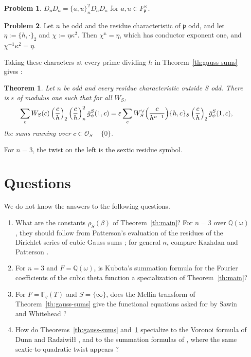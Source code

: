 \documentclass[reqno]{amsart}
\providecommand{\qr}[2]{\left(\frac{#1}{#2}\right)}
\newcommand{\pp}{\mathfrak{p}}
\numberwithin{equation}{section}
\theoremstyle{definition}
\newtheorem{problem}{Problem}[section]
\theoremstyle{plain}
\newtheorem{theorem}{Theorem}[section]
\begin{document}
\begin{problem}\label{pr:commutator}
  $D_u D_a = \{a, u\}_n^2 D_a D_u$ for $a, u \in F_\pp^\times$.
\end{problem}

\begin{problem}\label{pr:sextic}
  Let $n$ be odd and the residue characteristic of $\pp$ odd, and let $\eta := \{h, \cdot\}_2$ and $\chi := \eta \kappa^2$.  Then $\chi^n = \eta$, which has conductor exponent one, and $\chi^{-1} \kappa^2 = \eta$.
\end{problem}

Taking these characters at every prime dividing $h$ in Theorem~\ref{th:gauss-sums} gives \cite[Corollary~10.39]{N}:

\begin{theorem}\label{th:quadratic-dual}
  Let $n$ be odd and every residue characteristic outside $S$ odd.  There is $\varepsilon$ of modulus one such that for all $W_S$,
  \begin{equation*}
    \sum_{c} W_S(c) \qr{c}{h}_2 \qr{c}{h}_n^2 \tilde{g}_\psi^S(1, c)
    = \varepsilon \sum_c W_S^\vee \Bigl( \frac{c}{h^{n-1}} \Bigr) \{h, c\}_S \qr{c}{h}_2 \tilde{g}_\psi^S(1, c),
  \end{equation*}
  the sums running over $c \in \mathcal{O}_S - \{0\}$.
\end{theorem}

For $n = 3$, the twist on the left is the sextic residue symbol.

\section*{Questions}

We do not know the answers to the following questions.
\begin{enumerate}
\item What are the constants $\rho_S(\beta)$ of Theorem~\ref{th:main}?  For $n = 3$ over $\mathbb{Q}(\omega)$, they should follow from Patterson's evaluation of the residues of the Dirichlet series of cubic Gauss sums \cite[Theorem~9.1]{Pat}; for general $n$, compare Kazhdan and Patterson \cite[\S II.3]{KP}.
\item For $n = 3$ and $F = \mathbb{Q}(\omega)$, is Kubota's summation formula \cite{Kub74} for the Fourier coefficients of the cubic theta function a specialization of Theorem~\ref{th:main}?
\item For $F = \mathbb{F}_q(T)$ and $S = \{\infty\}$, does the Mellin transform of Theorem~\ref{th:gauss-sums} give the functional equations asked for by Sawin and Whitehead \cite[\S\S1.3, 1.5]{SW}?
\item How do Theorems~\ref{th:gauss-sums} and~\ref{th:quadratic-dual} specialize to the Voronoi formula of Dunn and Radziwi\l\l{} \cite[\S5]{DR}, and to the summation formulas of \cite{OAI}, where the same sextic-to-quadratic twist appears \cite[(2.14)]{OAI}?
\end{enumerate}
\end{document}
